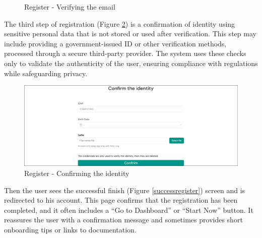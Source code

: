 \begin{figure}[H]
    \centering
    \caption{Register - Verifying the email}
    \label{registerstep2}
\end{figure}

The third step of registration (Figure \ref{registerstep3}) is a confirmation of identity using sensitive personal data that is not stored or used after verification. 
This step may include providing a government-issued ID or other verification methods, processed through a secure third-party provider. 
The system uses these checks only to validate the authenticity of the user, ensuring compliance with regulations while safeguarding privacy. 

\begin{figure}[H]
    \centering
    \includegraphics[width=18cm]{"images/figmaUI/register3-crop.png"}
    \caption{Register - Confirming the identity}
    \label{registerstep3}
\end{figure}

Then the user sees the successful finish (Figure \ref{successregister}) screen and is redirected to his account. 
This page confirms that the registration has been completed, and it often includes a ``Go to Dashboard'' or ``Start Now'' button. 
It reassures the user with a confirmation message and sometimes provides short onboarding tips or links to documentation.

